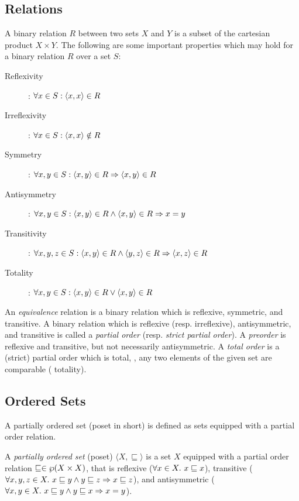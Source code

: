 \subsection{Relations}
A binary relation $R$ between two sets $X$ and $Y$ is a subset of the cartesian product $X \times Y$.
The following are some important properties which may hold for a binary relation $R$ over a set $S$:
\begin{description}
    \item[Reflexivity]: $\forall x \in S : \langle x, x \rangle \in R$
    \item[Irreflexivity]: $\forall x \in S : \langle x, x \rangle \notin R$
    \item[Symmetry]: $\forall x, y \in S : \langle x, y \rangle \in R \Rightarrow \langle x, y \rangle \in R$
    \item[Antisymmetry]: $\forall x, y \in S : \langle x, y \rangle \in R \wedge \langle x, y \rangle \in R \Rightarrow x = y$
    \item[Transitivity]: $\forall x, y, z \in S : \langle x, y \rangle \in R \wedge \langle y, z \rangle \in R \Rightarrow \langle x, z \rangle \in R$
    \item[Totality]: $\forall x, y \in S : \langle x, y \rangle \in R \vee \langle x, y \rangle \in R$
\end{description}

An \emph{equivalence} relation is a binary relation which is reflexive, symmetric, and transitive. A binary relation which is reflexive (resp. irreflexive), antisymmetric, and transitive is called a \emph{partial order} (resp. \emph{strict partial order}). A \emph{preorder} is reflexive and transitive, but not necessarily antisymmetric. A \emph{total order} is a (strict) partial order which is total, \ie, any two elements of the given set are comparable (\cf{} totality).




\subsection{Ordered Sets}

A partially ordered set (poset in short) is defined as sets equipped with a partial order relation.

\begin{definition}
  A \emph{partially ordered set} (poset) $\langle X, \sqsubseteq \rangle$ is a set $X$ equipped with a partial order relation $\sqsubseteq\in\wp(X\times X)$, that is reflexive ($\forall x \in X.~ x \sqsubseteq x$), transitive ($\forall x, y, z \in X.~ x \sqsubseteq y \land y \sqsubseteq z \Rightarrow x \sqsubseteq z$), and antisymmetric ($\forall x, y \in X.~ x \sqsubseteq y \land y \sqsubseteq x \Rightarrow x = y$).
\end{definition}

